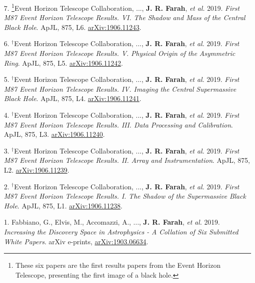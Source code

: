 \documentclass[margin,line]{res}
\newcommand{\apjl}{ApJL}                  %
\renewcommand{\thefootnote}{\fnsymbol{footnote}}
\begin{document}
\begin{resume}
\begin{mdframed}[linecolor=red]
7. {\renewcommand{\thefootnote}{\ensuremath{\dagger}}\renewcommand{\thempfootnote}{\ensuremath{\dagger}}\footnote{These six papers are the first results papers from the Event Horizon Telescope, presenting the first image of a black hole.}}Event Horizon Telescope Collaboration, ..., \textbf{J. R. Farah}, \textit{et al.} 2019. \textit{First M87 Event Horizon Telescope Results. VI. The Shadow and Mass of the Central Black Hole}. \apjl, 875, L6. \href{https://arxiv.org/abs/1906.11243}{arXiv:1906.11243}.

6. $^\dagger$Event Horizon Telescope Collaboration, ..., \textbf{J. R. Farah}, \textit{et al.} 2019. \textit{First M87 Event Horizon Telescope Results. V. Physical Origin of the Asymmetric Ring}. \apjl, 875, L5. \href{https://arxiv.org/abs/1906.11242}{arXiv:1906.11242}.

5. $^\dagger$Event Horizon Telescope Collaboration, ..., \textbf{J. R. Farah}, \textit{et al.} 2019. \textit{First M87 Event Horizon Telescope Results. IV. Imaging the Central Supermassive Black Hole}. \apjl, 875, L4. \href{https://arxiv.org/abs/1906.11241}{arXiv:1906.11241}.

4. $^\dagger$Event Horizon Telescope Collaboration, ..., \textbf{J. R. Farah}, \textit{et al.} 2019. \textit{First M87 Event Horizon Telescope Results. III. Data Processing and Calibration}. \apjl, 875, L3. \href{https://arxiv.org/abs/1906.11240}{arXiv:1906.11240}.

3. $^\dagger$Event Horizon Telescope Collaboration, ..., \textbf{J. R. Farah}, \textit{et al.} 2019. \textit{First M87 Event Horizon Telescope Results. II. Array and Instrumentation}. \apjl, 875, L2. \href{https://arxiv.org/abs/1906.11239}{arXiv:1906.11239}.

2. $^\dagger$Event Horizon Telescope Collaboration, ..., \textbf{J. R. Farah}, \textit{et al.} 2019. \textit{First M87 Event Horizon Telescope Results. I. The Shadow of the Supermassive Black Hole}. \apjl, 875, L1. \href{https://arxiv.org/abs/1906.11238}{arXiv:1906.11238}.

\end{mdframed}

1. Fabbiano, G., Elvis, M., Accomazzi, A., ..., \textbf{J. R. Farah}, \textit{et al.} 2019. \textit{Increasing the Discovery Space in Astrophysics - A Collation of Six Submitted White Papers}. arXiv e-prints, \href{https://arxiv.org/abs/1903.06634}{arXiv:1903.06634}.




\end{resume}
\end{document}
